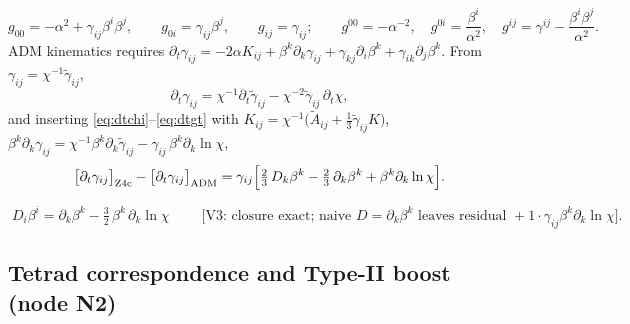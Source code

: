 \begin{equation}
g_{00} = -\alpha^2 + \gamma_{ij}\beta^i\beta^j,\qquad
g_{0i} = \gamma_{ij}\beta^j,\qquad
g_{ij} = \gamma_{ij};
\qquad
g^{00} = -\alpha^{-2},\quad
g^{0i} = \frac{\beta^i}{\alpha^{2}},\quad
g^{ij} = \gamma^{ij} - \frac{\beta^i\beta^j}{\alpha^{2}}.
\label{eq:fourmetric}
\end{equation}
ADM kinematics requires
$\partial_t\gamma_{ij} = -2\alpha K_{ij} + \beta^k\partial_k\gamma_{ij}
 + \gamma_{kj}\partial_i\beta^k + \gamma_{ik}\partial_j\beta^k$.
From $\gamma_{ij} = \chi^{-1}\tilde\gamma_{ij}$,
\begin{equation}
\partial_t\gamma_{ij}
 = \chi^{-1}\partial_t\tilde\gamma_{ij}
 - \chi^{-2}\tilde\gamma_{ij}\,\partial_t\chi ,
\label{eq:dtg-step1}
\end{equation}
and inserting \eqref{eq:dtchi}--\eqref{eq:dtgt} with
$K_{ij} = \chi^{-1}\big(\tilde A_{ij}+\tfrac13\tilde\gamma_{ij}K\big)$,
$\beta^k\partial_k\gamma_{ij} = \chi^{-1}\beta^k\partial_k\tilde\gamma_{ij}
 - \gamma_{ij}\,\beta^k\partial_k\ln\chi$,
\begin{equation}
\big[\partial_t\gamma_{ij}\big]_{\rm Z4c}
 - \big[\partial_t\gamma_{ij}\big]_{\rm ADM}
 = \gamma_{ij}\Big[\tfrac{2}{3}\,D_k\beta^k
 - \tfrac{2}{3}\,\partial_k\beta^k
 + \beta^k\partial_k\ln\chi\Big].
\label{eq:dtg-step2}
\end{equation}
\begin{nfblock}
\begin{equation}
\boxed{\;D_i\beta^i = \partial_k\beta^k
 - \tfrac{3}{2}\,\beta^k\,\partial_k\ln\chi\;}
\qquad\text{[V3: closure exact; naive }D=\partial_k\beta^k\text{ leaves
residual }+1\cdot\gamma_{ij}\beta^k\partial_k\ln\chi\text{]}.
\label{eq:divbeta}
\end{equation}
\end{nfblock}

\subsection{Tetrad correspondence and Type-II boost (node N2)}
\label{sec:n2}

